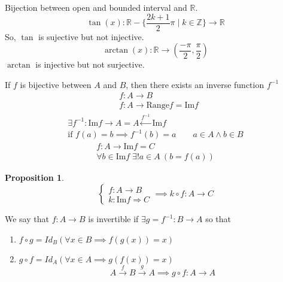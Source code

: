 \documentclass[letterpaper, 12pt]{article}
\newtheorem{proposition}[theorem]{Proposition}
\newenvironment{definition}[1][Definition]{\begin{trivlist}
\item[\hskip \labelsep {\bfseries #1}]}{\end{trivlist}}
\newenvironment{example}[1][Example]{\begin{trivlist}
\item[\hskip \labelsep {\bfseries #1}]}{\end{trivlist}}
\begin{document}
    \begin{example}
        Bijection between open and bounded interval and $\mathbb{R}$.
        \[\tan(x) : \mathbb{R} - \{\frac{2k + 1}{2}\pi \mid k \in \mathbb{Z}\} \rightarrow \mathbb{R}\]
        So, $\tan$ is sujective but not injective.
        \[\arctan(x) : \mathbb{R} \rightarrow (\frac{-\pi}{2}, \frac{\pi}{2})\]
        $\arctan$ is injective but not surjective.
    \end{example}
    \begin{definition}
        If $f$ is bijective between $A$ and $B$, then there exists an inverse function $f^{-1}$
        \begin{align*}
            &f: A \rightarrow B \\
            &f: A \rightarrow \text{Range} f = \text{Im} f
        \end{align*}
        \begin{gather*}
            \exists f^{-1} : \text{Im} f \rightarrow A = A\xleftarrow{f^{-1}} \text{Im} f \\
            \text{if } f(a) = b \implies f^{-1}(b) = a \qquad a \in A \wedge b \in B
        \end{gather*}
        \begin{gather*}
            f: A \rightarrow \text{Im} f = C \\
            \forall b \in \text{Im} f \; \exists! a \in A \: (b = f(a))
        \end{gather*}
    \end{definition}
    \begin{proposition}
        \[\begin{cases}
            f: A \rightarrow B \\
            k: \text{Im} f \Rightarrow C
        \end{cases}
        \implies k \circ f : A \rightarrow C\]
    \end{proposition}
    \begin{definition}
        We say that $f : A \rightarrow B$ is invertible if 
        $\exists g = f^{-1} : B \rightarrow A$ so that
        \begin{enumerate}
            \item $f \circ g = Id_B (\forall x \in B \implies f(g(x)) = x)$
            \item $g \circ f = Id_A (\forall x \in A \implies g(f(x)) = x)$
            \[A \xrightarrow{f} B \xrightarrow{g} A \implies g \circ f : A \rightarrow A\]
        \end{enumerate}
    \end{definition}
\end{document}
